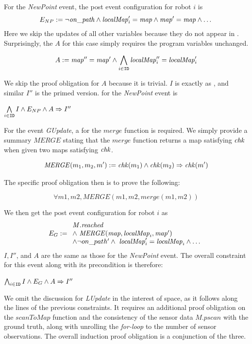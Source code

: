 For the \emph{NewPoint} event, the post event configuration for robot $i$ is
\[
E_{NP}:= \neg\mathit{on\_path} \land \mathit{localMap}_i' = \mathit{map} \land \mathit{map}' = \mathit{map} \land \dots
\]
Here we skip the updates of all other variables because they do not appear in .
Surprisingly, the \portasum $A$ for this case simply requires the program variables unchanged.
\begin{assumption}
\[
    A := \mathit{map}'' = \mathit{map}' \land \bigwedge\limits_{i \in \texttt{ID}} \mathit{localMap}_i'' = \mathit{localMap}_i'
\]
\end{assumption}
We skip the proof obligation  for $A$ because it is trivial.
$I$ is exactly as , and similar $I''$ is the primed version.
 for the \emph{NewPoint} event is
\begin{proofob}
\(
\bigwedge\limits_{i\in \texttt{ID}} I \land E_{NP} \land A \Rightarrow I''
\)
\end{proofob}

For the event \emph{GUpdate},
a \funcasum for the $\mathit{merge}$ function is required.
We simply provide a summary $\mathit{MERGE}$ stating that
the $\mathit{merge}$ function returns a map satisfying $\mathit{chk}$ when given two maps satisfying $\mathit{chk}$.

\begin{summary}
\[
\mathit{MERGE}(m_1, m_2, m') := \mathit{chk}(m_1) \land \mathit{chk}(m_2) \Rightarrow \mathit{chk}(m')
\]
\end{summary}
\noindent
The specific proof obligation then is to prove the following:
\begin{proofob}
    \label{merge}
    \[
    \forall m1, m2, MERGE(m1, m2, merge(m1, m2))
    \]
\end{proofob}
\noindent
We then get the post event configuration for robot $i$ as
\[
E_G :=
    \begin{array}{l}
        \mathit{M.reached} \\
        \land\ \mathit{MERGE}(\mathit{map}, \mathit{localMap}_i, \mathit{map}') \\
        \land \neg on\_path'\land\ \mathit{localMap}_i' = \mathit{localMap}_i \land \dots \\
    \end{array}
\]
$I, I''$, and $A$ are the same as those for the \emph{NewPoint} event.
The overall constraint for this event along with its precondition is therefore:
\begin{proofob}
\(
\bigwedge_{i\in \texttt{ID}} I \land E_G \land A \Rightarrow I''
\)
\end{proofob}

We omit the discussion for \emph{LUpdate} in the interest of space,
as it follows along the lines of the previous constraints.
It requires an additional proof obligation on the $\mathit{scanToMap}$ function and the consistency of the sensor data $\mathit{M.pscan}$ with the ground truth,
along with unrolling the \emph{for-loop} to the number of sensor observations.
The overall induction proof obligation is a conjunction of the three.

